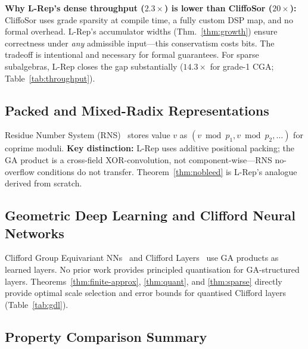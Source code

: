 \documentclass[11pt,a4paper]{article}
\theoremstyle{definition}
\theoremstyle{plain}
\theoremstyle{remark}
\begin{document}
\textbf{Why L-Rep's dense throughput ($2.3\times$) is lower than CliffoSor ($20\times$):}
CliffoSor uses grade sparsity at compile time, a fully custom DSP map,
and no formal overhead.
L-Rep's accumulator widths (Thm.~\ref{thm:growth}) ensure correctness
under \emph{any} admissible input---this conservatism costs bits.
The tradeoff is intentional and necessary for formal guarantees.
For sparse subalgebras, L-Rep closes the gap substantially
($14.3\times$ for grade-1 CGA; Table~\ref{tab:throughput}).

\subsection{Packed and Mixed-Radix Representations}
\label{sec:related-packed}

Residue Number System (RNS)~\cite{crt_fpga} stores value $v$ as
$(v \bmod p_1, v \bmod p_2, \ldots)$ for coprime moduli.
\textbf{Key distinction:}
L-Rep uses additive positional packing; the GA product is a
cross-field XOR-convolution, not component-wise---RNS no-overflow
conditions do not transfer.
Theorem~\ref{thm:nobleed} is L-Rep's analogue derived from scratch.

\subsection{Geometric Deep Learning and Clifford Neural Networks}
\label{sec:related-gdl}

Clifford Group Equivariant NNs~\cite{ruhe2023} and Clifford
Layers~\cite{brandstetter2023} use GA products as learned layers.
No prior work provides principled quantisation for GA-structured layers.
Theorems~\ref{thm:finite-approx}, \ref{thm:quant}, and \ref{thm:sparse}
directly provide optimal scale selection and error bounds for quantised
Clifford layers (Table~\ref{tab:gdl}).

\subsection{Property Comparison Summary}
\end{document}
